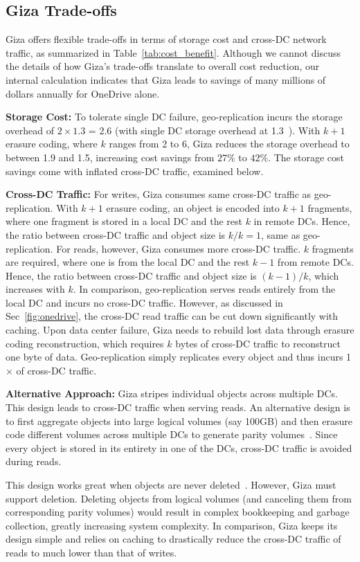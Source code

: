 \subsection{Giza Trade-offs}
\label{sec:alternative}

Giza offers flexible trade-offs in terms of storage cost and cross-DC network traffic,
as summarized in Table~\ref{tab:cost_benefit}.
Although we cannot discuss the details of how Giza's trade-offs translate to overall cost
reduction, our internal calculation indicates that Giza leads to savings of
many millions of dollars annually for OneDrive alone.

{\bf Storage Cost:} To tolerate single DC failure, geo-replication incurs the
storage overhead of $2\times1.3$ = 2.6 (with single DC storage overhead at 1.3~\cite{huang12erasure}).
With $k+1$ erasure coding, where $k$ ranges from 2 to 6, Giza reduces the
storage overhead to between 1.9 and 1.5, increasing cost savings from $27\%$ to
$42\%$. The storage cost savings come with inflated cross-DC traffic, examined
below.

{\bf Cross-DC Traffic:} For writes, Giza consumes same cross-DC traffic as
geo-replication. With $k+1$ erasure coding, an object is encoded into $k+1$
fragments, where one fragment is stored in a local DC and the rest $k$ in remote
DCs. Hence, the ratio between cross-DC traffic and object size is $k/k = 1$,
same as geo-replication. For reads, however, Giza consumes more cross-DC
traffic. $k$ fragments are required, where one is from the local DC and the rest
$k-1$ from remote DCs. Hence, the ratio between cross-DC traffic and object size
is $(k-1)/k$, which increases with $k$. In comparison, geo-replication serves
reads entirely from the local DC and incurs no cross-DC traffic. However, as
discussed in Sec~\ref{fig:onedrive}, the cross-DC read traffic can be cut
down significantly with caching. Upon data center failure, Giza needs to rebuild
lost data through erasure coding reconstruction, which requires $k$ bytes of
cross-DC traffic to reconstruct one byte of data. Geo-replication simply
replicates every object and thus incurs 1$\times$ of cross-DC traffic.

{\bf Alternative Approach:} Giza stripes individual objects across multiple DCs. This design leads to cross-DC traffic when serving reads. An alternative design is to first aggregate objects into large logical volumes (say 100GB) and then erasure code different volumes across multiple DCs to generate parity volumes~\cite{f4:osdi14}. Since every object is stored in its entirety in one of the DCs, cross-DC traffic is avoided during reads.

This design works great when objects are never deleted~\cite{f4:osdi14}. However, Giza must support deletion. Deleting objects from logical volumes (and canceling them from corresponding parity volumes) would result in complex bookkeeping and garbage collection, greatly increasing system complexity. In comparison, Giza keeps its design simple and relies on caching to drastically reduce the cross-DC traffic of reads to much lower than that of writes. 

